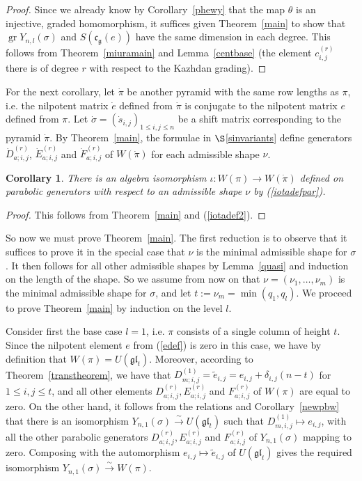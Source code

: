 \documentclass[twoside,12pt,reqno]{amsart}
\newtheorem{Corollary}[Proposition]{Corollary}
\def\gr{\operatorname{gr}}
\begin{document}
\begin{proof}
Since we already know by 
Corollary~\ref{phewy} that the map
$\theta$ is an injective, graded homomorphism, it suffices
given Theorem~\ref{main} to show that 
$\gr Y_{n,l}(\sigma)$ and $S(\mathfrak{c}_{\mathfrak{g}}(e))$
have the same dimension in each degree. 
This follows from Theorem~\ref{miuramain}
and Lemma~\ref{centbase} (the element
$c_{i,j}^{(r)}$ there is of degree $r$ with respect to the
Kazhdan grading).
\end{proof}

For the next corollary, let $\dot\pi$ be another pyramid with the same
row lengths as $\pi$, i.e. the nilpotent matrix $\dot e$
defined from $\dot\pi$ is conjugate to the nilpotent matrix $e$
defined from $\pi$.
Let $\dot\sigma = (\dot s_{i,j})_{1 \leq i,j \leq n}$ be a shift matrix
corresponding to the pyramid $\dot\pi$.
By Theorem~\ref{main}, the formulae in $\S$\ref{sinvariants} define
generators
$\dot D_{a;i,j}^{(r)}$,
$\dot E_{a;i,j}^{(r)}$ and $\dot F_{a;i,j}^{(r)}$
of $W(\dot\pi)$ for each admissible shape $\nu$.

\begin{Corollary}\label{oneiso}
There is an algebra isomorphism $\iota:W(\pi)\rightarrow W(\dot\pi)$
defined on parabolic generators with respect to an admissible shape
$\nu$ by (\ref{iotadefpar}).
\end{Corollary}

\begin{proof}
This follows from Theorem~\ref{main} and (\ref{iotadef2}).
\end{proof}

So now we must prove Theorem~\ref{main}.
The first reduction is to observe that it suffices
to prove it in the special
case that $\nu$ is the minimal admissible shape for $\sigma$.
It then follows for all other admissible shapes by Lemma~\ref{quasi}
and induction on the length of the shape.
So we assume from now on that $\nu=(\nu_1,\dots,\nu_m)$ 
is the minimal admissible shape for $\sigma$, 
and let $t := \nu_m = \min(q_1,q_l)$.
We proceed to prove Theorem~\ref{main}
by induction on the level $l$. 

Consider first the base case $l=1$, i.e. 
$\pi$ consists of a single column of height $t$.
Since the nilpotent element $e$ from (\ref{edef})
is zero in this case, we have by definition that
$W(\pi) = U(\mathfrak{gl}_t)$. Moreover,
according to Theorem~\ref{transtheorem}, we have that
$D_{m;i,j}^{(1)} = \tilde e_{i,j}
= e_{i,j} + \delta_{i,j}(n-t)$ for $1 \leq i,j \leq t$,
and all other elements $D_{a;i,j}^{(r)}, E_{a;i,j}^{(r)}$ and
$F_{a;i,j}^{(r)}$ of $W(\pi)$ are equal to zero. 
On the other hand, it follows from the relations and Corollary~\ref{newpbw} 
that there is an 
isomorphism $Y_{n,1}(\sigma) \stackrel{\sim}{\rightarrow} 
U(\mathfrak{gl}_t)$ such that
$D_{m,i,j}^{(1)} \mapsto e_{i,j}$, with all the other parabolic generators
$D_{a;i,j}^{(r)},
E_{a;i,j}^{(r)}$ and $F_{a;i,j}^{(r)}$ 
of $Y_{n,1}(\sigma)$ mapping to zero.
Composing with the automorphism $e_{i,j} \mapsto \tilde e_{i,j}$
of $U(\mathfrak{gl}_t)$ gives the 
required isomorphism $Y_{n,1}(\sigma) \stackrel{\sim}{\rightarrow}
W(\pi)$. 
\end{document}
